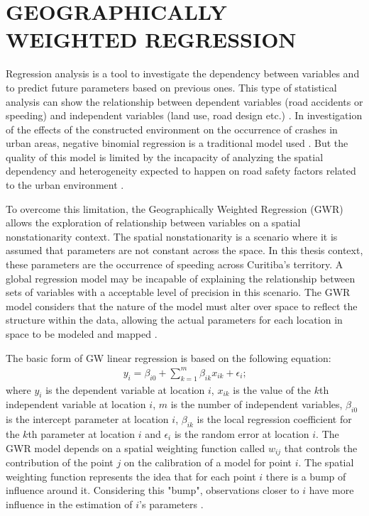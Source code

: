 


\section{GEOGRAPHICALLY WEIGHTED REGRESSION}

Regression analysis is a tool to investigate the dependency between variables and to predict future parameters based on previous ones. This type of statistical analysis can show the relationship between dependent variables (road accidents or speeding) and independent variables (land use, road design etc.) \cite{Lindley1987}. In investigation of the effects of the constructed environment on the occurrence of crashes in urban areas, negative binomial regression is a traditional model used \cite{Wei2013, Zhang2014}. But the quality of this model is limited by the incapacity of analyzing the spatial dependency and heterogeneity expected to happen on road safety factors related to the urban environment \cite{Obelheiro2019}.


To overcome this limitation, the Geographically Weighted Regression (GWR) allows the exploration of relationship between variables on a spatial nonstationarity context. The spatial nonstationarity is a scenario where it is assumed that parameters are not constant across the space. In this thesis context, these parameters are the occurrence of speeding across Curitiba's territory. A global regression model may be incapable of explaining the relationship between sets of variables with a acceptable level of precision in this scenario. The GWR model considers that the nature of the model must alter over space to reflect the structure within the data, allowing the actual parameters for each location in space to be modeled and mapped \cite{Brunsdon2010}.

The basic form of GW linear regression is based on the following equation:\begin{align}
    y_i = \beta_{i0} + \sum_{k=1}^{m} \beta_{ik} x_{ik} + \epsilon_i \mbox{;}
    \label{eq:gwr}
\end{align} where $y_i$ is the dependent variable at location $i$, $x_{ik}$ is the value of the $k$th independent variable at location $i$, $m$ is the number of independent variables, $\beta_{i0}$ is the intercept parameter at location $i$, $\beta_{ik}$ is the local regression coefficient for the $k$th parameter at location $i$ and $\epsilon_i$ is the random error at location $i$. The GWR model depends on a spatial weighting function called $w_{ij}$ that controls the contribution of the point $j$ on the calibration of a model for point $i$. The spatial weighting function represents the idea that for each point $i$ there is a bump of influence around it. Considering this "bump", observations closer to $i$ have more influence in the estimation of $i$'s parameters \cite{Brunsdon2010,Gollini2013}.

